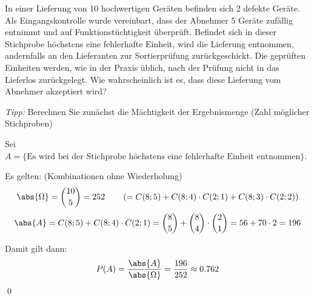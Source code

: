 \documentclass{abgabe}
\begin{document}
\begin{questions}
    \question
    In einer Lieferung von 10 hochwertigen Geräten befinden sich 2 defekte Geräte. 
    Als Eingangskontrolle wurde vereinbart, dass der Abnehmer 5 Geräte zufällig entnimmt und auf Funktionstüchtigkeit überprüft. 
    Befindet sich in dieser Stichprobe höchstens eine fehlerhafte Einheit, wird die Lieferung entnommen, andernfalls an den Lieferanten zur Sortierprüfung zurückgeschickt. 
    Die geprüften Einheiten werden, wie in der Praxis üblich, nach der Prüfung nicht in das Lieferlos zurückgelegt. 
    Wie wahrscheinlich ist es, dass diese Lieferung vom Abnehmer akzeptiert wird? 
    
    \emph{Tipp:} Berechnen Sie zunächst die Mächtigkeit der Ergebnismenge (Zahl möglicher Stichproben)
    \begin{solution}
        Sei $A = \{ \text{Es wird bei der Stichprobe höchstens eine fehlerhafte Einheit entnommen} \}$.
        
        Es gelten: (Kombinationen ohne Wiederholung)
        \[ 
            \abs{\Omega} = \binom{10}{5} = 252 \qquad \left( = C(8;5) + C(8;4) \cdot C(2;1) + C(8;3) \cdot C(2;2) \right)
        \]
        \[ 
            \abs{A} = C(8;5) + C(8;4) \cdot C(2;1) = \binom{8}{5} + \binom{8}{4} \cdot \binom{2}{1} = 56 + 70 \cdot 2 = 196
        \]
        
        Damit gilt dann: 
        \[ 
            P(A) = \frac{\abs{A}}{\abs{\Omega}} = \frac{196}{252} \approx 0.762
        \]
        \qed
    \end{solution}
\end{questions}
\end{document}
